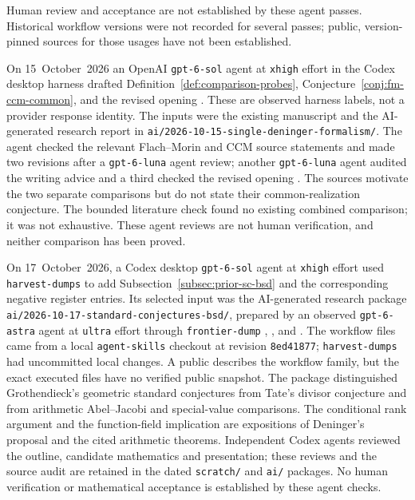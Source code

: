 \documentclass[11pt]{amsart}
\theoremstyle{plain}
\theoremstyle{definition}
\theoremstyle{remark}
\numberwithin{equation}{section}
\begin{document}
Human review and acceptance are not established by these agent passes.
Historical workflow versions were not recorded for several passes;
public, version-pinned sources for those usages have not been established.

On 15~October~2026 an OpenAI \nolinkurl{gpt-6-sol} agent at
\nolinkurl{xhigh} effort in the Codex desktop harness
\cite[\href{https://developers.openai.com/api/docs/models/gpt-6-sol}
{model description}]{OpenAIGPT6Sol}
drafted Definition~\ref{def:comparison-probes},
Conjecture~\ref{conj:fm-ccm-common}, and the revised opening
\cite[\href{https://openai.com/codex/}{product description}]%
{OpenAICodex}. These are observed harness labels, not a provider
response identity. The inputs were the existing manuscript and the
AI-generated research report in
\nolinkurl{ai/2026-10-15-single-deninger-formalism/}.
The agent checked the relevant Flach--Morin and CCM source statements
and made two revisions after a \nolinkurl{gpt-6-luna} agent review;
another \nolinkurl{gpt-6-luna} agent audited the writing advice and
a third checked the revised opening
\cite[\href{https://developers.openai.com/api/docs/models/gpt-6-luna}
{model description}]{OpenAIGPT6Luna}.
The sources motivate the two
separate comparisons but do not state their common-realization
conjecture. The bounded literature check found no existing combined
comparison; it was not exhaustive. These agent reviews are not human
verification, and neither comparison has been proved.

On 17~October~2026, a Codex desktop \nolinkurl{gpt-6-sol} agent at
\nolinkurl{xhigh} effort used \nolinkurl{harvest-dumps} to add
Subsection~\ref{subsec:prior-sc-bsd} and the corresponding negative
register entries. Its selected input was the AI-generated research
package \nolinkurl{ai/2026-10-17-standard-conjectures-bsd/}, prepared
by an observed \nolinkurl{gpt-6-astra} agent at \nolinkurl{ultra}
effort through \nolinkurl{frontier-dump}
\cite[\href{https://openai.com/codex/}{product description}]
{OpenAICodex},
\cite[\href{https://developers.openai.com/api/docs/models/gpt-6-sol}
{model description}]{OpenAIGPT6Sol}, and
\cite[\href{https://developers.openai.com/api/docs/models/gpt-6-astra}
{model description}]{OpenAIGPT6Astra}.
The workflow files came from a local \nolinkurl{agent-skills}
checkout at revision \nolinkurl{8ed41877};
\nolinkurl{harvest-dumps} had uncommitted local changes. A public
\cite[\href{https://github.com/tdupu/mathcity/blob/%
c87fb990708ba1e8493133c6a8f17877004444c1/%
docs/agent-skills-mirror.md}{workflow reference snapshot}]
{Dupuy2026skills} describes the workflow family, but the exact
executed files have no verified public snapshot.
The package
distinguished Grothendieck's geometric standard conjectures from
Tate's divisor conjecture and from arithmetic Abel--Jacobi and
special-value comparisons. The conditional rank argument and the
function-field implication are expositions of Deninger's proposal and
the cited arithmetic theorems. Independent Codex agents reviewed the
outline, candidate mathematics and presentation; these reviews and the
source audit are retained in the dated \nolinkurl{scratch/} and
\nolinkurl{ai/} packages. No human verification or mathematical
acceptance is established by these agent checks.
\end{document}
